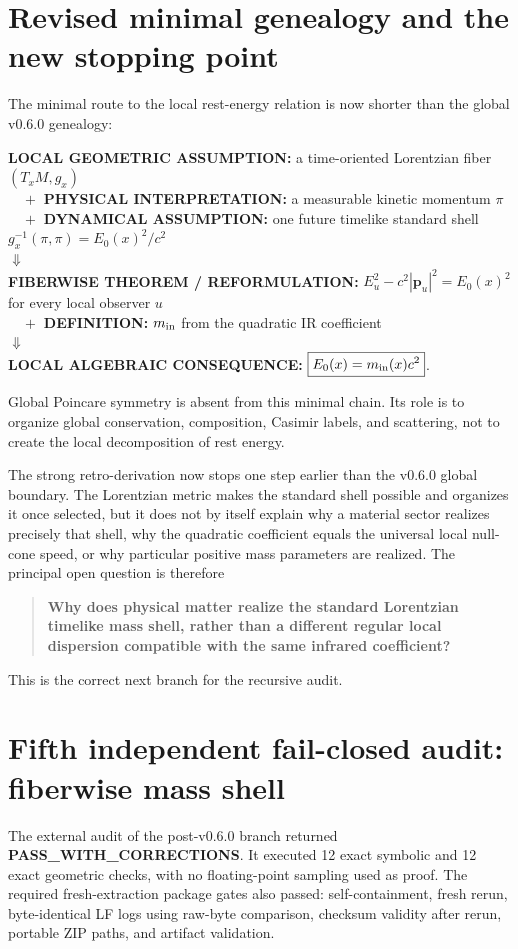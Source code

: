 \documentclass[11pt,a4paper]{article}
\begin{document}
\section{Revised minimal genealogy and the new stopping point}
The minimal route to the local rest-energy relation is now shorter than the global v0.6.0 genealogy:
\begin{center}
\begin{minipage}{0.91\linewidth}
\small
\textbf{LOCAL GEOMETRIC ASSUMPTION:} a time-oriented Lorentzian fiber $(T_xM,g_x)$\\
$\quad+$ \textbf{PHYSICAL INTERPRETATION:} a measurable kinetic momentum $\pi$\\
$\quad+$ \textbf{DYNAMICAL ASSUMPTION:} one future timelike standard shell
$g_x^{-1}(\pi,\pi)=E_0(x)^2/c^2$\\[0.3em]
$\Downarrow$\\[-0.2em]
\textbf{FIBERWISE THEOREM / REFORMULATION:}
$E_u^2-c^2|\mathbf p_u|^2=E_0(x)^2$ for every local observer $u$\\[0.3em]
$\quad+$ \textbf{DEFINITION:} $m_{\rm in}$ from the quadratic IR coefficient\\[0.3em]
$\Downarrow$\\[-0.2em]
\textbf{LOCAL ALGEBRAIC CONSEQUENCE:}
$\boxed{E_0(x)=m_{\rm in}(x)c^2}$.
\end{minipage}
\end{center}
Global Poincare symmetry is absent from this minimal chain.  Its role is to organize global conservation, composition, Casimir labels, and scattering, not to create the local decomposition of rest energy.

The strong retro-derivation now stops one step earlier than the v0.6.0 global boundary.  The Lorentzian metric makes the standard shell possible and organizes it once selected, but it does not by itself explain why a material sector realizes precisely that shell, why the quadratic coefficient equals the universal local null-cone speed, or why particular positive mass parameters are realized.  The principal open question is therefore
\begin{quote}
\textbf{Why does physical matter realize the standard Lorentzian timelike mass shell, rather than a different regular local dispersion compatible with the same infrared coefficient?}
\end{quote}
This is the correct next branch for the recursive audit.

\section{Fifth independent fail-closed audit: fiberwise mass shell}
The external audit of the post-v0.6.0 branch returned \textbf{PASS\_WITH\_CORRECTIONS}.  It executed 12 exact symbolic and 12 exact geometric checks, with no floating-point sampling used as proof.  The required fresh-extraction package gates also passed: self-containment, fresh rerun, byte-identical LF logs using raw-byte comparison, checksum validity after rerun, portable ZIP paths, and artifact validation.
\end{document}
